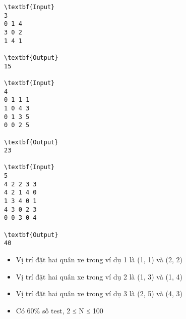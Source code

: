 \begin{verbatim}
\textbf{Input}
3
0 1 4
3 0 2
1 4 1

\textbf{Output}
15

\textbf{Input}
4
0 1 1 1
1 0 4 3
0 1 3 5
0 0 2 5

\textbf{Output}
23

\textbf{Input}
5
4 2 2 3 3
4 2 1 4 0
1 3 4 0 1
4 3 0 2 3
0 0 3 0 4

\textbf{Output}
40\end{verbatim}
\begin{itemize}
	\item Vị trí đặt hai quân xe trong ví dụ 1 là (1, 1) và (2, 2)
	\item Vị trí đặt hai quân xe trong ví dụ 2 là (1, 3) và (1, 4)
	\item Vị trí đặt hai quân xe trong ví dụ 3 là (2, 5) và (4, 3)
\end{itemize}
\begin{itemize}
	\item Có 60\% số test, 2 ≤ N ≤ 100
\end{itemize}